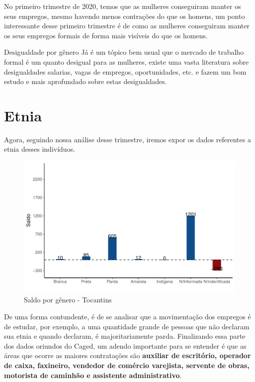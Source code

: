 \par No primeiro trimestre de 2020, temos que as mulheres conseguiram manter os seus empregos, mesmo havendo menos contrações do que os homens, um ponto interessante desse primeiro trimestre é de como as mulheres conseguiram manter os seus empregos formais de forma mais visíveis do que os homens.


\begin{smbox}[label={labelbox},nameref={Desigualdade por gênero}]{Desigualdade por gênero}
	Já é um tópico bem usual que o mercado de trabalho formal é um quanto desigual para as mulheres, existe uma vasta literatura sobre desigualdades salarias, vagas de empregos, oportunidades, etc. \cite{bibCotrim2020desigualdade} e \cite{bibHaussmann2018desigualdades} fazem um bom estudo e mais aprofundado sobre estas desigualdades.
\end{smbox}

\section{Etnia}
\par Agora, seguindo nossa análise desse trimestre, iremos expor os dados referentes a etnia desses indivíduos.

\begin{figure}[h]
	\caption{Saldo por gênero - Tocantins}
	\includegraphics[width=\linewidth]{fig/Saldo por etnia.pdf}
\end{figure}

\par De uma forma contundente, é de se analisar que a movimentação dos empregos é de estudar, por exemplo, a uma quantidade grande de pessoas que não declaram sua etnia e quando declaram, é majoritariamente parda. Finalizando essa parte dos dados oriundos do Caged, um adendo importante para se entender é que as áreas que ocorre as maiores contratações são \textbf{auxiliar de escritório, operador de caixa, faxineiro, vendedor de comércio varejista, servente de obras, motorista de caminhão e assistente administrativo}.

